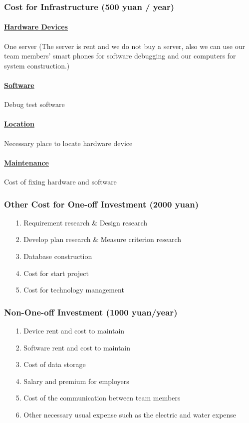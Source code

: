 \documentclass[10pt]{article}
\begin{document}
\subsubsection{Cost for Infrastructure (500 yuan / year)}
\paragraph{\underline{Hardware Devices}}
One server (The server is rent and we do not buy a server, 		also we can use our team members’ smart phones for software debugging and our computers for system construction.) 

\paragraph{\underline{Software}} Debug test software

\paragraph{\underline{Location}} Necessary place to locate hardware device

\paragraph{\underline{Maintenance}} Cost of fixing hardware and software

\subsubsection{Other Cost for One-off Investment (2000 yuan)}
\begin{itemize}
  \item[1.] Requirement research \& Design research
  \item[2.] Develop plan research \& Measure criterion research
  \item[3.]	Database construction
  \item[4.]	Cost for start project
  \item[5.]	Cost for technology management
  
\end{itemize}

\subsubsection{Non-One-off Investment (1000 yuan/year)}
\begin{itemize}
  \item[1.] Device rent and cost to maintain
  \item[2.]	Software rent and cost to maintain
  \item[3.]	Cost of data storage
  \item[4.]	Salary and premium for employers
  \item[5.]	Cost of the communication between team members
  \item[6.]	Other necessary usual expense such as the electric and water expense 
  
\end{itemize}
\end{document}
